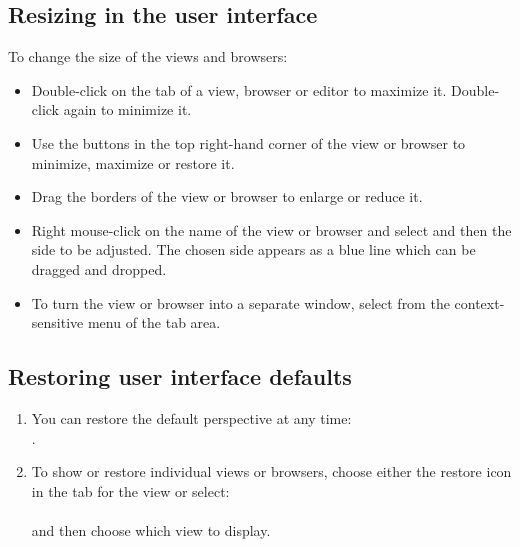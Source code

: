 \subsection{Resizing in the user interface}

To change the size of the views and browsers:
\begin{itemize}
\item Double-click on the tab of a view, browser or editor to maximize it. Double-click again to minimize it.
\item  Use the buttons in the  top right-hand corner of the view or browser to 
minimize, maximize or restore it.  
\item Drag the borders of the view or browser to enlarge or reduce it.
\item Right mouse-click on the name of the view or browser and select
 and then the side to be adjusted. The chosen side 
appears as a blue line which can be dragged and dropped. 
\item To turn the view or browser into a separate window, select 
\mbox{}
 from
the context-sensitive menu of the tab area. 
\end{itemize}  


\subsection{Restoring user interface defaults}
\begin{enumerate}
\item You can restore the default perspective at any time: \\ 
.
\item To show or restore individual views or browsers, choose either the \bxcaption
{restore} icon in the tab for the view or  select: \\
\\
 and then choose which view to display.
\end{enumerate}

